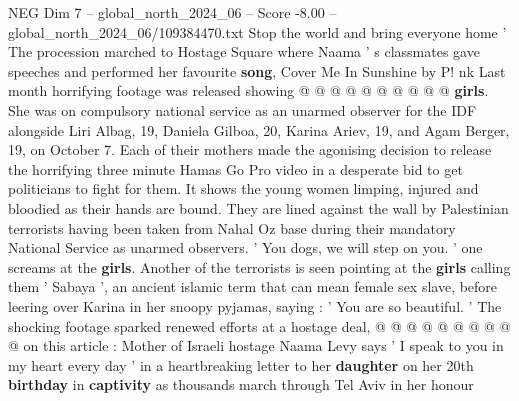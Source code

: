 \begin{textsample}{NEG Dim 7 – global\_north\_2024\_06 – Score -8.00 – global\_north\_2024\_06/109384470.txt}
Stop the world and bring everyone home ' The procession marched to Hostage Square where Naama ' s classmates gave speeches and performed her favourite \textbf{song}, Cover Me In Sunshine by P! nk Last month horrifying footage was released showing @ @ @ @ @ @ @ @ @ @ \textbf{girls}.
She was on compulsory national service as an unarmed observer for the IDF alongside Liri Albag, 19, Daniela Gilboa, 20, Karina Ariev, 19, and Agam Berger, 19, on October 7.
Each of their mothers made the agonising decision to release the horrifying three minute Hamas Go Pro video in a desperate bid to get politicians to fight for them.
It shows the young women limping, injured and bloodied as their hands are bound.
They are lined against the wall by Palestinian terrorists having been taken from Nahal Oz base during their mandatory National Service as unarmed observers. ' You dogs, we will step on you. ' one screams at the \textbf{girls}.
Another of the terrorists is seen pointing at the \textbf{girls} calling them ' Sabaya ', an ancient islamic term that can mean female sex slave, before leering over Karina in her snoopy pyjamas, saying : ' You are so beautiful. ' The shocking footage sparked renewed efforts at a hostage deal, @ @ @ @ @ @ @ @ @ @ on this article : Mother of Israeli hostage Naama Levy says ' I speak to you in my heart every day ' in a heartbreaking letter to her \textbf{daughter} on her 20th \textbf{birthday} in \textbf{captivity} as thousands march through Tel Aviv in her honour

\end{textsample}
